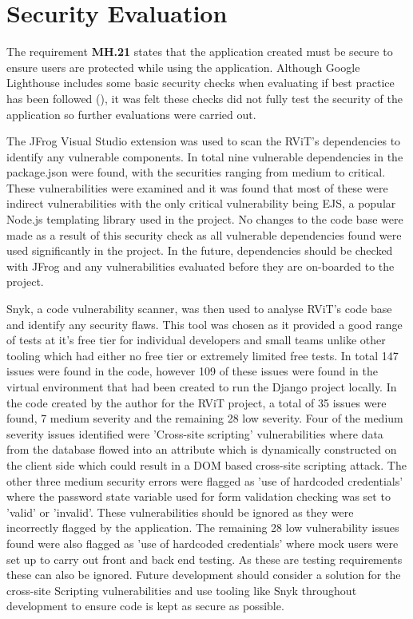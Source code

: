 \documentclass[l4proj.tex]{subfiles}
\begin{document}
\section{Security Evaluation}
The requirement \textbf{MH.21} states that the application created must be secure to ensure users are protected while using the application. Although Google Lighthouse includes some basic security checks when evaluating if best practice has been followed (\cite{LighthouseOverview}), it was felt these checks did not fully test the security of the application so further evaluations were carried out. 

The JFrog Visual Studio extension was used to scan the RViT's dependencies to identify any vulnerable components. In total nine vulnerable dependencies in the package.json were found, with the securities ranging from medium to critical. These vulnerabilities were examined and it was found that most of these were indirect vulnerabilities with the only critical vulnerability being EJS, a popular Node.js templating library used in the project. No changes to the code base were made as a result of this security check as all vulnerable dependencies found were used significantly in the project. In the future, dependencies should be checked with JFrog and any vulnerabilities evaluated before they are on-boarded to the project. 

Snyk, a code vulnerability scanner, was then used to analyse RViT's code base and identify any security flaws. This tool was chosen as it provided a good range of tests at it's free tier for individual developers and small teams unlike other tooling which had either no free tier or extremely limited free tests. In total 147 issues were found in the code, however 109 of these issues were found in the virtual environment that had been created to run the Django project locally. In the code created by the author for the RViT project, a total of 35 issues were found, 7 medium severity and the remaining 28 low severity. Four of the medium severity issues identified were 'Cross-site scripting' vulnerabilities where data from the database flowed into an attribute which is dynamically constructed on the client side which could result in a DOM based cross-site scripting attack. The other three medium security errors were flagged as 'use of hardcoded credentials' where the password state variable used for form validation checking was set to 'valid' or 'invalid'. These vulnerabilities should be ignored as they were incorrectly flagged by the application. The remaining 28 low vulnerability issues found were also flagged as 'use of hardcoded credentials' where mock users were set up to carry out front and back end testing. As these are testing requirements these can also be ignored. Future development should consider a solution for the cross-site Scripting vulnerabilities and use tooling like Snyk throughout development to ensure code is kept as secure as possible.
\end{document}
